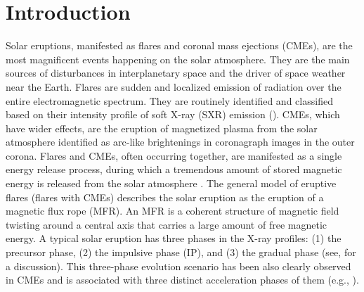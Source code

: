\documentclass{aastex62}
\begin{document}

\section{Introduction} \label{sec:intro}
Solar eruptions, manifested as flares and coronal mass ejections (CMEs), are the most magnificent events happening on the solar atmosphere. They are the main sources of disturbances in interplanetary space and the driver of space weather near the Earth. Flares are sudden and localized emission of radiation over the entire electromagnetic spectrum. They are routinely identified and classified based on their intensity profile of soft X-ray (SXR) emission (\citealt{Fletcher_etal_2011}). CMEs, which have wider effects, are the eruption of magnetized plasma from the solar atmosphere identified as arc-like brightenings in coronagraph images in the outer corona. Flares and CMEs, often occurring together, are manifested as a single energy release process, during which a tremendous amount of stored magnetic energy is released from the solar atmosphere \citep{Forbes_etal_2000}. The general model of eruptive flares (flares with CMEs) describes the solar eruption as the eruption of a magnetic flux rope (MFR). An MFR is a coherent structure of magnetic field twisting around a central axis that carries a large amount of free magnetic energy. A typical solar eruption has three phases in the X-ray profiles: (1) the precursor phase, (2) the impulsive phase (IP), and (3) the gradual phase (see, \citealt{Zhou_etal_2016} for a discussion). This three-phase evolution scenario has been also clearly observed in CMEs and is associated with three distinct acceleration phases of them (e.g., \citealt{Zhang_etal_2001}).
\end{document}
